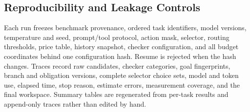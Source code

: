 \subsection{Reproducibility and Leakage Controls}

Each run freezes benchmark provenance, ordered task identifiers, model
versions, temperature and seed, prompt/tool protocol, action mask, selector,
routing thresholds, price table, history snapshot, checker configuration, and
all budget coordinates behind one configuration hash. Resume is rejected when
the hash changes. Traces record raw candidates, checker categories, goal
fingerprints, branch and obligation versions, complete selector choice sets,
model and token use, elapsed time, stop reason, estimate errors, measurement
coverage, and the final workspace. Summary tables are regenerated from
per-task results and append-only traces rather than edited by hand.
